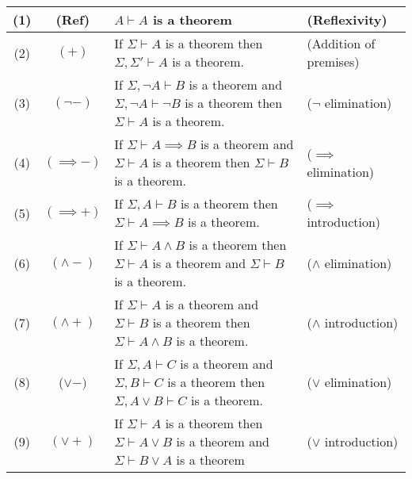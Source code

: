 \documentclass{article}
\begin{document}
\begin{table}[h]
    \centering
    \begin{tabular}{ccp{6cm}p{4cm}}\hline
        (1) & (Ref) & $A \vdash A$ is a theorem & (Reflexivity)\\ \hline
         (2) & $(+)$ & {If $\Sigma \vdash A$ is a theorem \newline then $\Sigma, \Sigma' \vdash A$ is a theorem.} & (Addition of premises)\\ \hline
         (3) & $(\neg -)$ & {If $\Sigma, \neg A \vdash B$ is a theorem and \newline $\Sigma, \neg A \vdash \neg B$ is a theorem \newline then $\Sigma \vdash A$ is a theorem.}& ($\neg$ elimination)\\ \hline
         (4) & $(\implies -)$ & {If $\Sigma \vdash A \implies B$ is a theorem and \newline $\Sigma \vdash A$ is a theorem \newline then $\Sigma \vdash B$ is a theorem.} & ($\implies$ elimination)\\ \hline
         (5) & $(\implies +)$ & {If $\Sigma, A \vdash B$ is a theorem \newline then $\Sigma \vdash A \implies B$ is a theorem.} & ($\implies$ introduction)\\ \hline
         (6) & $(\wedge -)$ & {If $\Sigma \vdash A \wedge B$ is a theorem \newline then $\Sigma \vdash A$ is a theorem and \newline $\Sigma \vdash B$ is a theorem.} & ($\wedge$ elimination)\\ \hline
         (7) & $(\wedge +)$ &  {If $\Sigma \vdash A$ is a theorem and \newline $\Sigma \vdash B$ is a theorem \newline then $\Sigma \vdash A \wedge B$ is a theorem.}& ($\wedge$ introduction)\\ \hline
         (8) & ($\vee -)$ & {If $\Sigma, A \vdash C$ is a theorem and \newline $\Sigma, B \vdash C$ is a theorem \newline then $\Sigma, A \vee B \vdash C$ is a theorem.}& ($\vee$ elimination)\\ \hline
         (9) & $(\vee +)$ & {If $\Sigma \vdash A$ is a theorem \newline then $\Sigma \vdash A \vee B$ is a theorem and \newline $\Sigma \vdash B \vee A$ is a theorem}& ($\vee$ introduction)\\ \hline

\end{tabular}
\end{table}
\end{document}
